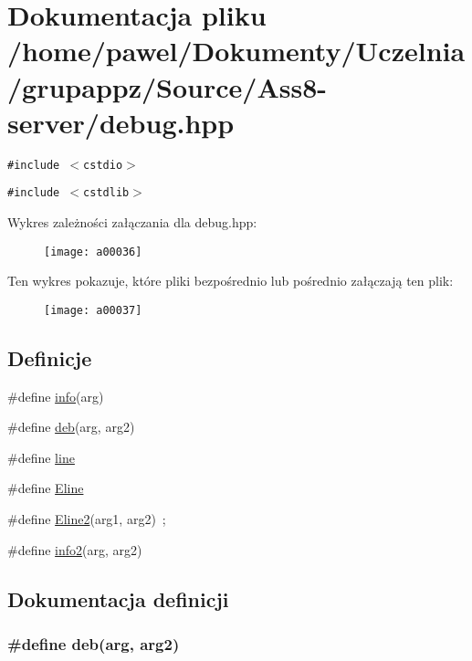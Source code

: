 \hypertarget{a00008}{
\section{Dokumentacja pliku /home/pawel/Dokumenty/Uczelnia/grupappz/Source/Ass8-server/debug.hpp}
\label{a00008}
}
{\tt \#include $<$cstdio$>$}\par
{\tt \#include $<$cstdlib$>$}\par


Wykres zależności załączania dla debug.hpp:\nopagebreak
\begin{figure}[H]
\begin{center}
\leavevmode
\texttt{[image: a00036]}
\end{center}
\end{figure}


Ten wykres pokazuje, które pliki bezpośrednio lub pośrednio załączają ten plik:\nopagebreak
\begin{figure}[H]
\begin{center}
\leavevmode
\texttt{[image: a00037]}
\end{center}
\end{figure}
\subsection*{Definicje}
\begin{CompactItemize}
\item 
\#define \hyperlink{a00008_590af51ecfed28223c4e6ce02994241a}{info}(arg)
\item 
\#define \hyperlink{a00008_21ad5938437ed6d1865dd14c8d1871bc}{deb}(arg, arg2)
\item 
\#define \hyperlink{a00008_5bdec07ba0f5f220bcb40d5258725d95}{line}
\item 
\#define \hyperlink{a00008_9944134306515208e366f3f347ef3653}{Eline}
\item 
\#define \hyperlink{a00008_68b6fd999967bd748d50fc2014bc5903}{Eline2}(arg1, arg2)~;
\item 
\#define \hyperlink{a00008_51633d6d15647d74f756bcf969fc70ae}{info2}(arg, arg2)
\end{CompactItemize}


\subsection{Dokumentacja definicji}
\hypertarget{a00008_21ad5938437ed6d1865dd14c8d1871bc}{
\subsubsection[{deb}]{\setlength{\rightskip}{0pt plus 5cm}\#define deb(arg, \/  arg2)}}
\label{a00008_21ad5938437ed6d1865dd14c8d1871bc}




